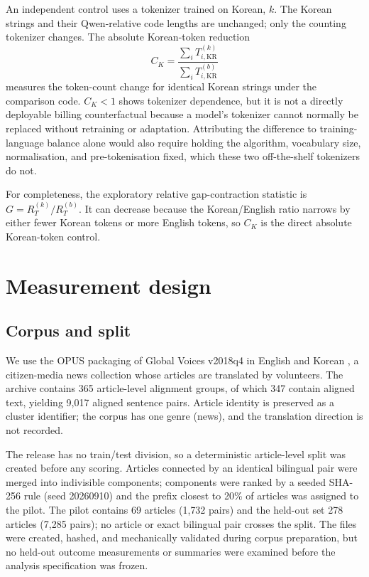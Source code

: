 \documentclass[11pt,a4paper]{article}
\newcommand{\RT}{R_{T}}
\newcommand{\CK}{C_{K}}
\newcommand{\ko}{\mathrm{KR}}
\begin{document}
An independent control uses a tokenizer trained on Korean, $k$. The Korean
strings and their Qwen-relative code lengths are unchanged; only the counting
tokenizer changes.
The absolute Korean-token reduction
\begin{equation}
  \CK=\frac{\sum_i T^{(k)}_{i,\ko}}{\sum_i T^{(b)}_{i,\ko}}
\end{equation}
measures the token-count change for identical Korean strings under the
comparison code. $\CK<1$ shows tokenizer dependence, but it is not a directly
deployable billing counterfactual because a model's tokenizer cannot normally
be replaced without retraining or adaptation. Attributing the difference to
training-language balance alone would also require holding the algorithm,
vocabulary size, normalisation, and pre-tokenisation fixed, which these two
off-the-shelf tokenizers do not.

For completeness, the exploratory relative gap-contraction statistic is
$G=\RT^{(k)}/\RT^{(b)}$. It can decrease because the Korean/English ratio
narrows by either fewer Korean tokens or more English tokens, so $\CK$ is the
direct absolute Korean-token control.

\section{Measurement design}
\label{sec:design}

\subsection{Corpus and split}

We use the OPUS packaging of Global Voices v2018q4 in English and Korean
\citep{tiedemann2012opus,prokopidis2016globalvoices}, a citizen-media news collection whose articles are
translated by volunteers. The archive contains 365 article-level alignment
groups, of which 347 contain aligned text, yielding 9{,}017 aligned sentence
pairs. Article identity is preserved as a cluster identifier; the corpus has
one genre (news), and the translation direction is not recorded.

The release has no train/test division, so a deterministic article-level
split was created before any scoring. Articles connected by an identical
bilingual pair were merged into indivisible components; components were
ranked by a seeded SHA-256 rule (seed 20260910) and the prefix closest to 20\%
of articles was assigned to the pilot. The pilot contains 69 articles
(1{,}732 pairs) and the held-out set 278 articles (7{,}285 pairs); no article
or exact bilingual pair crosses the split. The files were created, hashed,
and mechanically validated during corpus preparation, but no held-out outcome
measurements or summaries were examined before the analysis specification was
frozen.
\end{document}
